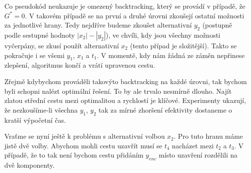 \documentclass[
  biblatex,
  figures=false,
  glossaries,
  index
]{kidiplom}
\begin{document}
Co pseudokód neukazuje je omezený backtracking, který se provádí v případě, že $G^* = 0$. V takovém případě se na první a druhé úrovni zkoušejí ostatní možnosti za jednotlivé hrany. Tedy nejdříve budeme zkoušet alternativní $y_2$ (postupně podle sestupné hodnoty $|x_2| - |y_2|$), ve chvíli, kdy jsou všechny možnosti vyčerpány, se zkusí použít alternativní $x_2$ (tento případ je složitější). Takto se pokračuje i se všemi $y_1$, $x_1$ a $t_1$. V momentě, kdy nám žádná ze záměn nepřinese zlepšení, algoritmus končí a vrátí upravenou cestu.

\hspace{6.5mm}Zřejmě kdybychom prováděli takovýto backtracking na každé úrovni, tak bychom byli schopni nalézt optimální řešení. To by ale trvalo nesmírně dlouho. Najít zlatou střední cestu mezi optimalitou a rychlostí je klíčové. Experimenty ukazují, že nezkoušíme-li všechna $y_1$, $y_2$ tak za mírné zhoršení efektivity dostaneme o kratší výpočetní čas.

\hspace{6.5mm}Vraťme se nyní ještě k problému s alternativní volbou $x_2$. Pro tuto hranu máme jistě dvě volby. Abychom mohli cestu uzavřít musí se $t_4$ nacházet mezi $t_2$ a $t_3$. V případě, že to tak není bychom cestu přidáním $y_{enc}$ místo uzavření rozdělili na dvě komponenty.
\end{document}
